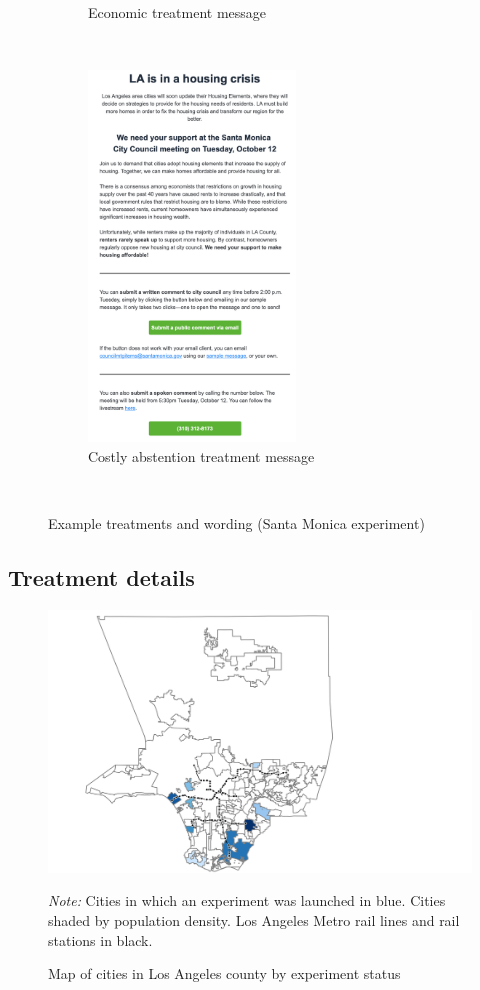 \documentclass[12pt,final,fleqn]{article}
\theoremstyle{plain}
\begin{document}
\begin{figure}[H]
\begin{subfigure}[b]{0.45\textwidth}
        \caption{Economic treatment message} \label{subfig: T2}
    \end{subfigure}
    ~
    \begin{subfigure}[b]{0.45\textwidth}
        \centering
        \includegraphics[width=5.5cm]{../figs/fgA2.4.png}
        \caption{Costly abstention treatment message} \label{subfig: T3}
    \end{subfigure}
    ~
    \caption{Example treatments and wording (Santa Monica experiment)}\label{fig: treatments}
\end{figure}


\subsection{Treatment details} \label{sec: treatment_details}

\begin{figure}[H]
\hspace*{-3.5cm} 
\includegraphics[width = 30cm]{../figs/fgA5.png}
\caption{Map of cities in Los Angeles county by experiment status}
\label{fig: map_treated_cities}
\vspace{-0.5cm}
\begin{singlespace}
\textit{Note:} Cities in which an experiment was launched in blue.  Cities shaded by population density. Los Angeles Metro rail lines and rail stations in black. 
\end{singlespace}
\end{figure}
\end{document}
